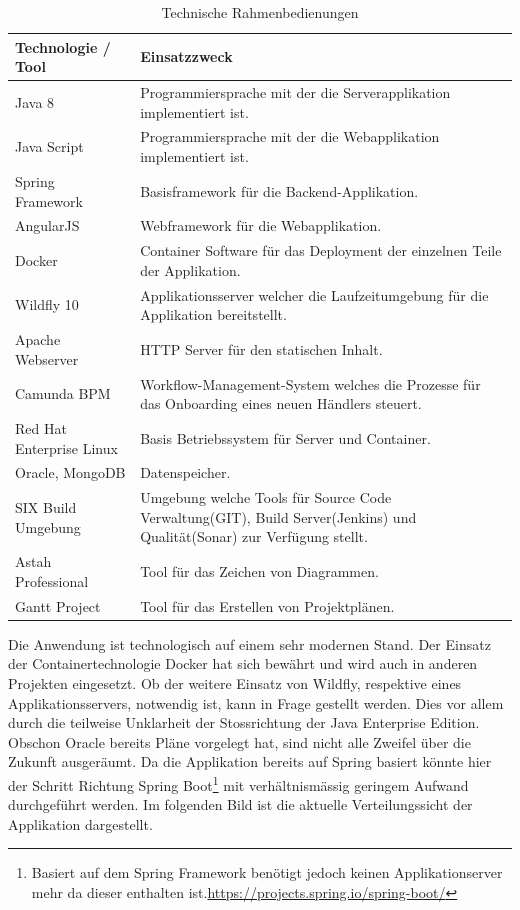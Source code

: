 \begin{table}[H]
	\centering
	\caption{Technische Rahmenbedienungen}
	\begin{tabular}{ | p{4cm} | p{11cm} | }
		\toprule
		{\textbf{Technologie / Tool}} & {\textbf{Einsatzzweck}} \\
		\midrule
		Java 8 & Programmiersprache mit der die Serverapplikation implementiert ist. \\ \hline
		Java Script & Programmiersprache mit der die Webapplikation implementiert ist. \\ \hline
		Spring Framework & Basisframework für die Backend-Applikation.  \\ \hline
		AngularJS & Webframework für die Webapplikation. \\ \hline
		Docker & Container Software für das Deployment der einzelnen Teile der Applikation. \\ \hline
		Wildfly 10 & Applikationsserver welcher die Laufzeitumgebung für die Applikation bereitstellt. \\ \hline
		Apache Webserver & HTTP Server für den statischen Inhalt. \\ \hline
		Camunda BPM & Workflow-Management-System welches die Prozesse für das Onboarding eines neuen Händlers steuert. \\ \hline
		Red Hat Enterprise Linux & Basis Betriebssystem für Server und Container.\\ \hline
		Oracle, MongoDB & Datenspeicher. \\ \hline
		SIX Build Umgebung & Umgebung welche Tools für Source Code Verwaltung(GIT), Build Server(Jenkins) und Qualität(Sonar) zur Verfügung stellt.\\ \hline
		Astah Professional & Tool für das Zeichen von Diagrammen.\\ \hline
		Gantt Project & Tool für das Erstellen von Projektplänen.\\		
		\bottomrule
	\end{tabular}
\end{table}
\noindent Die Anwendung ist technologisch auf einem sehr modernen Stand. Der Einsatz der Containertechnologie Docker hat sich bewährt und wird auch in anderen Projekten eingesetzt. Ob der weitere Einsatz von Wildfly, respektive eines Applikationsservers, notwendig ist, kann in Frage gestellt werden. Dies vor allem durch die teilweise Unklarheit der Stossrichtung der Java Enterprise Edition. Obschon Oracle bereits Pläne vorgelegt hat, sind nicht alle Zweifel über die Zukunft ausgeräumt. Da die Applikation bereits auf Spring basiert könnte hier der Schritt Richtung Spring Boot\footnote{Basiert auf dem Spring Framework benötigt jedoch keinen Applikationserver mehr da dieser enthalten ist.\url{https://projects.spring.io/spring-boot/}} mit verhältnismässig geringem Aufwand durchgeführt werden. Im folgenden Bild ist die aktuelle Verteilungssicht der Applikation dargestellt.
